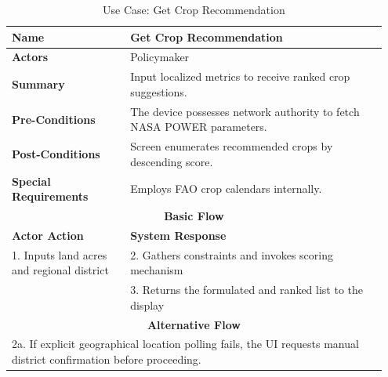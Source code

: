 \begin{table}[htbp]
  \centering
  \caption{Use Case: Get Crop Recommendation}
  \label{uc:get_crop_rec}
  \begin{tabular}{|p{0.3\linewidth}|p{0.65\linewidth}|}
    \hline
    \textbf{Name} & Get Crop Recommendation \\
    \hline
    \textbf{Actors} & Policymaker \\
    \hline
    \textbf{Summary} & Input localized metrics to receive ranked crop suggestions. \\
    \hline
    \textbf{Pre-Conditions} & The device possesses network authority to fetch NASA POWER parameters. \\
    \hline
    \textbf{Post-Conditions} & Screen enumerates recommended crops by descending score. \\
    \hline
    \textbf{Special Requirements} & Employs FAO crop calendars internally. \\
    \hline
    \multicolumn{2}{|c|}{\textbf{Basic Flow}} \\
    \hline
    \textbf{Actor Action} & \textbf{System Response} \\
    \hline
    1. Inputs land acres and regional district & 2. Gathers constraints and invokes scoring mechanism \\
    & 3. Returns the formulated and ranked list to the display \\
    \hline
    \multicolumn{2}{|c|}{\textbf{Alternative Flow}} \\
    \hline
    \multicolumn{2}{|p{0.95\linewidth}|}{2a. If explicit geographical location polling fails, the UI requests manual district confirmation before proceeding.} \\
    \hline
  \end{tabular}
\end{table}

